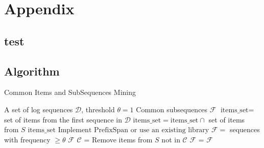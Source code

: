 \section{Appendix}


\subsection{test}

\subsection{Algorithm}

\begin{algorithm}
\caption{Common Items and SubSequences Mining}
\label{alg:fre-common}
\begin{algorithmic}[1]
\Require A set of log sequences \( \mathcal{D} \), threshold \( \theta=1 \)
\Ensure Common subsequences \( \mathcal{F} \)
\Statex
{}
    \State \( \text{items\_set} = \) set of items from the first sequence in \( \mathcal{D} \)
        \State \( \text{items\_set} = \text{items\_set} \cap \) set of items from \(S\)
    \EndFor
    \State \Return \( \text{items\_set} \) 
\EndFunction
\Statex
{}
    \State \( \text{Implement PrefixSpan or use an existing library} \)
    \State \( \mathcal{F} = \) sequences with frequency \( \geq \theta \)
    \State \Return \( \mathcal{F} \)
\EndFunction
\Statex
{}
    \State \( \mathcal{C} \) = 
        \State Remove items from \(S\) not in \( \mathcal{C} \)
    \EndFor
    \State \( \mathcal{F} \) = 
    \State \Return \( \mathcal{F} \)
\EndFunction
\end{algorithmic}
\end{algorithm}


